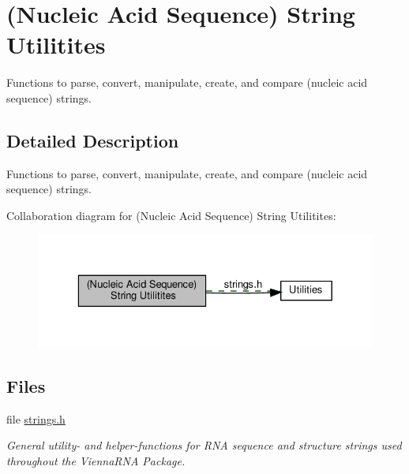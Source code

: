 \hypertarget{group__string__utils}{}\section{(Nucleic Acid Sequence) String Utilitites}
\label{group__string__utils}


Functions to parse, convert, manipulate, create, and compare (nucleic acid sequence) strings.  




\subsection{Detailed Description}
Functions to parse, convert, manipulate, create, and compare (nucleic acid sequence) strings. 

Collaboration diagram for (Nucleic Acid Sequence) String Utilitites\+:
\nopagebreak
\begin{figure}[H]
\begin{center}
\leavevmode
\includegraphics[width=329pt]{group__string__utils}
\end{center}
\end{figure}
\subsection*{Files}
\begin{DoxyCompactItemize}
\item 
file \hyperlink{strings_8h}{strings.\+h}
\begin{DoxyCompactList}\small\item\em General utility-\/ and helper-\/functions for R\+NA sequence and structure strings used throughout the Vienna\+R\+NA Package. \end{DoxyCompactList}\end{DoxyCompactItemize}
